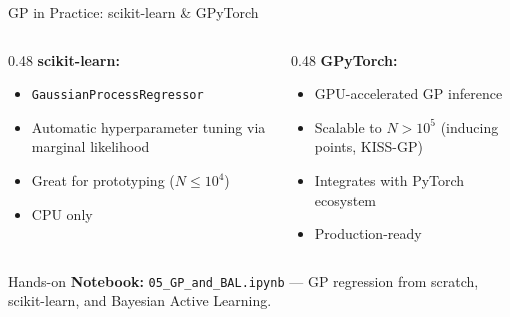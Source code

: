 \documentclass[aspectratio=169,11pt]{beamer}
\begin{document}
\begin{frame}{GP in Practice: scikit-learn \& GPyTorch}
\begin{columns}[T]
\begin{column}{0.48\textwidth}
\textbf{scikit-learn:}
\begin{itemize}
  \item \texttt{GaussianProcessRegressor}
  \item Automatic hyperparameter tuning via marginal likelihood
  \item Great for prototyping ($N \leq 10^4$)
  \item CPU only
\end{itemize}
\end{column}
\begin{column}{0.48\textwidth}
\textbf{GPyTorch:}
\begin{itemize}
  \item GPU-accelerated GP inference
  \item Scalable to $N > 10^5$ (inducing points, KISS-GP)
  \item Integrates with PyTorch ecosystem
  \item Production-ready
\end{itemize}
\end{column}
\end{columns}

\vspace{0.5cm}
\begin{block}{Hands-on}
\textbf{Notebook:} \texttt{05\_GP\_and\_BAL.ipynb} --- GP regression from scratch, scikit-learn, and Bayesian Active Learning.
\end{block}
\end{frame}
\end{document}

